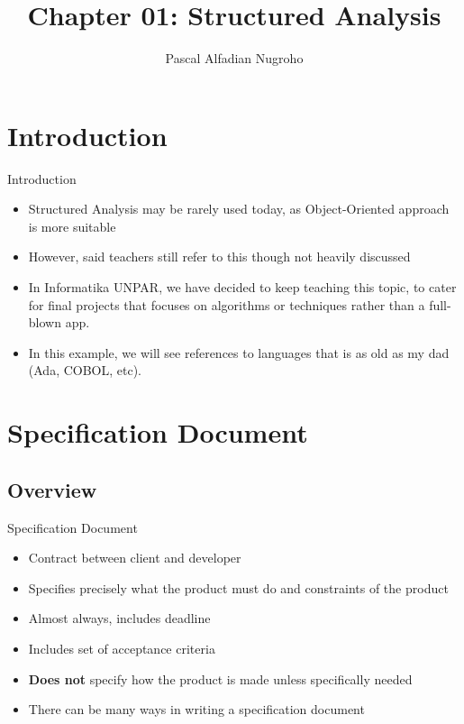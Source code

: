 \documentclass{beamer}
\title{Chapter 01: Structured Analysis}
\author[P.A. Nugroho]{Pascal Alfadian Nugroho}
\institute[IF-UNPAR]{Program Studi Informatika, \\Universitas Katolik Parahyangan}
\begin{document}
	\begin{frame}
		\titlepage
	\end{frame}

	\section{Introduction}
	\begin{frame}{Introduction}
		\begin{itemize}
			\item Structured Analysis may be rarely used today, as Object-Oriented approach is more suitable
			\item However, \cite[page xvi]{Schach:2006:OCS:1207045} said teachers still refer to this though not heavily discussed
			\item In Informatika UNPAR, we have decided to keep teaching this topic, to cater for final projects that focuses on algorithms or techniques rather than a full-blown app.
			\item In this example, we will see references to languages that is as old as my dad (Ada, COBOL, etc).
		\end{itemize}
	\end{frame}
	
	\section{Specification Document}
	\subsection{Overview}
	\begin{frame}{Specification Document}
		\begin{itemize}
			\item Contract between client and developer
			\item Specifies precisely what the product must do and constraints of the product
			\item Almost always, includes deadline
			\item Includes set of acceptance criteria
			\item \textbf{Does not} specify how the product is made unless specifically needed
			\item There can be many ways in writing a specification document
		\end{itemize}
	\end{frame}
\end{document}
